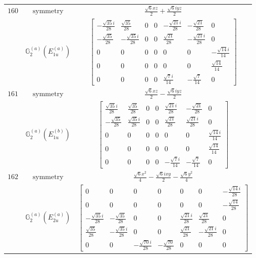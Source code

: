 \documentclass[fleqn,8pt,landscape]{jsarticle}
\begin{document}
\begin{longtable}{ccc}
$ 160 $ & $ \text{symmetry} $ & $ \frac{\sqrt{6} x z}{2} + \frac{\sqrt{6} i y z}{2} $ \\
$  $ & $ \mathbb{G}_{2}^{(a)}(E_{1u}^{(a)}) $ & $ \begin{bmatrix} - \frac{\sqrt{35} i}{28} & \frac{\sqrt{35}}{28} & 0 & 0 & - \frac{\sqrt{21} i}{28} & - \frac{\sqrt{21}}{28} & 0 \\ - \frac{\sqrt{35}}{28} & - \frac{\sqrt{35} i}{28} & 0 & 0 & \frac{\sqrt{21}}{28} & - \frac{\sqrt{21} i}{28} & 0 \\ 0 & 0 & 0 & 0 & 0 & 0 & - \frac{\sqrt{14} i}{14} \\ 0 & 0 & 0 & 0 & 0 & 0 & \frac{\sqrt{14}}{14} \\ 0 & 0 & 0 & 0 & \frac{\sqrt{7} i}{14} & - \frac{\sqrt{7}}{14} & 0 \end{bmatrix} $ \\ \hline
$ 161 $ & $ \text{symmetry} $ & $ \frac{\sqrt{6} x z}{2} - \frac{\sqrt{6} i y z}{2} $ \\
$  $ & $ \mathbb{G}_{2}^{(a)}(E_{1u}^{(b)}) $ & $ \begin{bmatrix} \frac{\sqrt{35} i}{28} & \frac{\sqrt{35}}{28} & 0 & 0 & \frac{\sqrt{21} i}{28} & - \frac{\sqrt{21}}{28} & 0 \\ - \frac{\sqrt{35}}{28} & \frac{\sqrt{35} i}{28} & 0 & 0 & \frac{\sqrt{21}}{28} & \frac{\sqrt{21} i}{28} & 0 \\ 0 & 0 & 0 & 0 & 0 & 0 & \frac{\sqrt{14} i}{14} \\ 0 & 0 & 0 & 0 & 0 & 0 & \frac{\sqrt{14}}{14} \\ 0 & 0 & 0 & 0 & - \frac{\sqrt{7} i}{14} & - \frac{\sqrt{7}}{14} & 0 \end{bmatrix} $ \\ \hline
$ 162 $ & $ \text{symmetry} $ & $ \frac{\sqrt{6} x^{2}}{4} - \frac{\sqrt{6} i x y}{2} - \frac{\sqrt{6} y^{2}}{4} $ \\
$  $ & $ \mathbb{G}_{2}^{(a)}(E_{2u}^{(a)}) $ & $ \begin{bmatrix} 0 & 0 & 0 & 0 & 0 & 0 & - \frac{\sqrt{14} i}{28} \\ 0 & 0 & 0 & 0 & 0 & 0 & - \frac{\sqrt{14}}{28} \\ - \frac{\sqrt{35} i}{28} & - \frac{\sqrt{35}}{28} & 0 & 0 & \frac{\sqrt{21} i}{28} & \frac{\sqrt{21}}{28} & 0 \\ \frac{\sqrt{35}}{28} & - \frac{\sqrt{35} i}{28} & 0 & 0 & \frac{\sqrt{21}}{28} & - \frac{\sqrt{21} i}{28} & 0 \\ 0 & 0 & - \frac{\sqrt{70} i}{28} & - \frac{\sqrt{70}}{28} & 0 & 0 & 0 \end{bmatrix} $ \\ \hline

\end{longtable}
\end{document}
